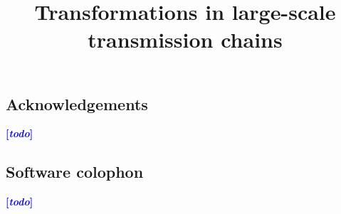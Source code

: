 \documentclass[jou]{apa6}
\title{Transformations in large-scale transmission chains}
\date{}
\newcommand{\tb}[1]{\textcolor{blue}{#1}}
\newcommand{\rk}[1]{\tb{{\footnotesize {\bf[\emph{#1}]}}}}
\begin{document}
\maketitle







\subsection*{Acknowledgements}
\rk{todo}

\subsection*{Software colophon}
\rk{todo}


\printbibliography


\end{document}
